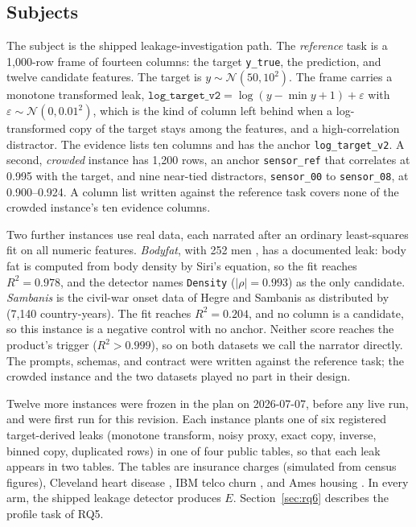 \documentclass[smallextended,natbib]{svjour3}
\begin{document}
\subsection{Subjects}

The subject is the shipped leakage-investigation path. The \emph{reference}
task is a 1,000-row frame of fourteen columns: the target \texttt{y\_true},
the prediction, and twelve candidate features. The target is
$y\sim\mathcal{N}(50,10^2)$. The frame carries a monotone transformed leak,
$\texttt{log\_target\_v2}=\log(y-\min y+1)+\varepsilon$ with
$\varepsilon\sim\mathcal{N}(0,0.01^2)$, which is the kind of column left behind
when a log-transformed copy of the target stays among the features, and a
high-correlation distractor. The evidence lists ten columns and has the
anchor \texttt{log\_target\_v2}. A second, \emph{crowded} instance has 1,200
rows, an anchor \texttt{sensor\_ref} that correlates at 0.995 with the target,
and nine near-tied distractors, \texttt{sensor\_00} to \texttt{sensor\_08}, at
0.900--0.924. A column list written against the reference task covers none of
the crowded instance's ten evidence columns.

Two further instances use real data, each narrated after an ordinary
least-squares fit on all numeric features. \emph{Bodyfat}, with 252
men \citep{penrose1985bodyfat}, has a documented leak: body fat is computed from
body density by Siri's equation, so the fit reaches $R^2=0.978$, and the
detector names \texttt{Density} ($|\rho|=0.993$) as the only candidate.
\emph{Sambanis} is the civil-war onset data of Hegre and Sambanis as
distributed by \citet{muchlinski2016civilwar} (7{,}140
country-years). The fit reaches $R^2=0.204$, and no column is a candidate, so
this instance is a negative control with no anchor. Neither score reaches the
product's trigger ($R^2>0.999$), so on both datasets we call the narrator
directly. The prompts, schemas, and contract were written against the
reference task; the crowded instance and the two datasets played no part in
their design.

Twelve more instances were frozen in the plan on 2026-07-07, before any live
run, and were first run for this revision. Each instance plants one of six
registered target-derived leaks (monotone transform, noisy proxy, exact copy,
inverse, binned copy, duplicated rows) in one of four public tables, so that
each leak appears in two tables. The tables are insurance
charges \citep{lantz2013mlr} (simulated from census figures), Cleveland heart
disease \citep{janosi1988heart}, IBM telco churn \citep{ibm2019telco}, and Ames
housing \citep{decock2011ames}. In every arm, the shipped leakage detector
produces $E$. Section~\ref{sec:rq6} describes the profile task of RQ5.
\end{document}

